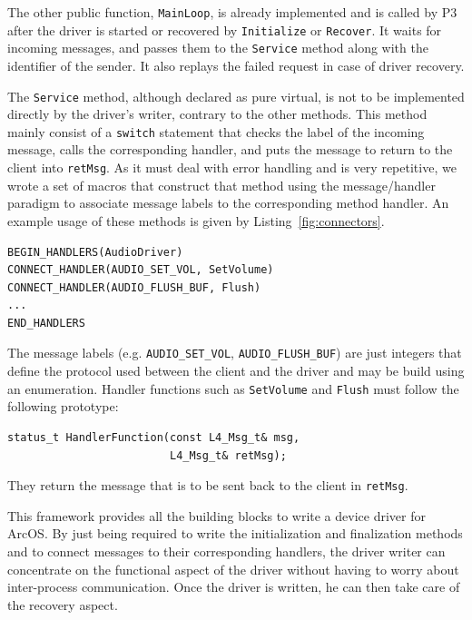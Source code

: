 \documentclass{report}
\begin{document}
The other public function, \texttt{MainLoop}, is already implemented and is called by P3 after the driver is started or recovered by \texttt{Initialize} or \texttt{Recover}. It waits for incoming messages, and passes them to the \texttt{Service} method along with the identifier of the sender. It also replays the failed request in case of driver recovery.

The \texttt{Service} method, although declared as pure virtual, is not to be implemented directly by the driver's writer, contrary to the other methods. This method mainly consist of a \texttt{switch} statement that checks the label of the incoming message, calls the corresponding handler, and puts the message to return to the client into \texttt{retMsg}. As it must deal with error handling and is very repetitive, we wrote a set of macros that construct that method using the message/handler paradigm to associate message labels to the corresponding method handler. An example usage of these methods is given by Listing~\ref{fig:connectors}.

\begin{lstlisting}[style=nonumbers,caption=Example usage of the message/handler macros.,label=fig:connectors]
BEGIN_HANDLERS(AudioDriver)
CONNECT_HANDLER(AUDIO_SET_VOL, SetVolume)
CONNECT_HANDLER(AUDIO_FLUSH_BUF, Flush)
...
END_HANDLERS
\end{lstlisting}

The message labels (e.g. \texttt{AUDIO\_SET\_VOL}, \texttt{AUDIO\_FLUSH\_BUF}) are just integers that define the protocol used between the client and the driver and may be build using an enumeration. Handler functions such as \texttt{SetVolume} and \texttt{Flush} must follow the following prototype:

\begin{lstlisting}[style=nonumbers,caption=Handler function prototype.,label=fig:handler]
status_t HandlerFunction(const L4_Msg_t& msg,
                         L4_Msg_t& retMsg);
\end{lstlisting}

They return the message that is to be sent back to the client in \texttt{retMsg}.

This framework provides all the building blocks to write a device driver for ArcOS. By just being required to write the initialization and finalization methods and to connect messages to their corresponding handlers, the driver writer can concentrate on the functional aspect of the driver without having to worry about inter-process communication. Once the driver is written, he can then take care of the recovery aspect.
\end{document}

